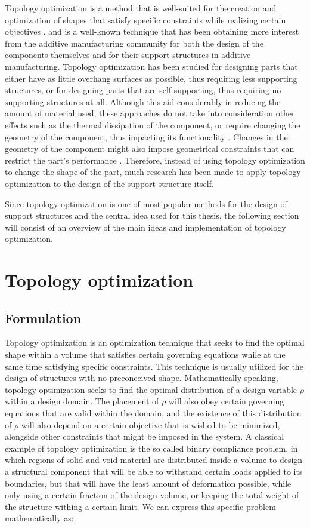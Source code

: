\documentclass[../main.tex]{subfiles}
\begin{document}
Topology optimization is a method that is well-suited for the creation and optimization of shapes that satisfy specific constraints while realizing certain objectives \cite{bendsoeTopologyOptimization2002}, and is a well-known technique that has been obtaining more interest from the additive manufacturing community for both the design of the components themselves and for their support structures in additive manufacturing. Topology optimization has been studied for designing parts that either have as little overhang surfaces as possible, thus requiring less supporting structures, or for designing parts that are self-supporting, thus requiring no supporting structures at all. Although this aid considerably in reducing the amount of material used, these approaches do not take into consideration other effects such as the thermal dissipation of the component, or require changing the geometry of the component, thus impacting its functionality \cite{yeTopologyOptimisationSelfsupporting2023}. Changes in the geometry of the component might also impose geometrical constraints that can restrict the part's performance \cite{langelaarTOPOLOGYOPTIMIZATIONADDITIVE2016}. Therefore, instead of using topology optimization to change the shape of the part, much research has been made to apply topology optimization to the design of the support structure itself.

Since topology optimization is one of most popular methods for the design of support structures and the central idea used for this thesis, the following section will consist of an overview of the main ideas and implementation of topology optimization.

\section{Topology optimization}

\subsection{Formulation}
Topology optimization is an optimization technique that seeks to find the optimal shape within a volume that satisfies certain governing equations while at the same time satisfying specific constraints. This technique is usually utilized for the design of structures with no preconceived shape. Mathematically speaking, topology optimization seeks to find the optimal distribution of a design variable $\rho$ within a design domain. The placement of $\rho$ will also obey certain governing equations that are valid within the domain, and the existence of this distribution of $\rho$ will also depend on a certain objective that is wished to be minimized, alongside other constraints that might be imposed in the system. A classical example of topology optimization is the so called binary compliance problem, in which regions of solid and void material are distributed inside a volume to design a structural component that will be able to withstand certain loads applied to its boundaries, but that will have the least amount of deformation possible, while only using a certain fraction of the design volume, or keeping the total weight of the structure withing a certain limit. We can express this specific problem mathematically as:
\end{document}
